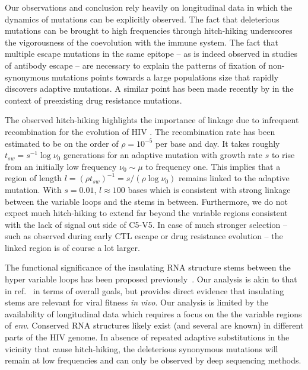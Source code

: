 \documentclass[rmp, twocolumn]{revtex4}
\newcommand{\env}{\textit{env}}
\begin{document}
Our observations and conclusion rely heavily on longitudinal data in which the dynamics of mutations can be explicitly observed. The fact that deleterious mutations can be brought to high frequencies through hitch-hiking underscores the vigorousness of the coevolution with the immune system. The fact that multiple escape mutations in the same epitope -- as is indeed observed in studies of antibody escape \citep{sdfsd} -- are necessary to explain the patterns of fixation of non-synonymous mutations points towards a large populations size that rapidly discovers adaptive mutations. A similar point has been made recently by \citet{boltz_ultrasensitive_2012} in the context of preexisting drug resistance mutations. 

The observed hitch-hiking highlights the importance of linkage due to infrequent recombination for the evolution of HIV \citep{neher_recombination_2010,batorsky_estimate_2011,joseffson_smth_2011}. The recombination rate has been estimated to be on the order of $\rho = 10^{-5}$ per base and day. It takes roughly $t_{sw} = s^{-1} \log \nu_0$ generations for an adaptive mutation with growth rate $s$ to rise from an initially low frequency $\nu_0\sim \mu$ to frequency one. This implies that a region of length $l = (\rho t_{sw})^{-1} = s/(\rho \log \nu_0)$ remains linked to the adaptive mutation. With $s=0.01$, $l\approx 100$ bases which is consistent with strong linkage between the variable loops and the stems in between. Furthermore, we do not expect much hitch-hiking to extend far beyond the variable regions consistent with the lack of signal out side of C5-V5. In case of much stronger selection -- such as observed during early CTL escape or drug resistance evolution -- the linked  region is of course a lot larger. 

The functional significance of the insulating RNA structure stems between the hyper variable loops has been proposed previously~\citep{watts_architecture_2009, sanjuan_interplay_2011}. Our analysis is akin to that in ref.~\citep{sanjuan_interplay_2011} in terms of overall goals, but provides direct evidence that insulating stems are relevant for viral fitness {\it in vivo}. Our analysis is limited by the availability of longitudinal data which requires a focus on the the variable regions of \env. Conserved RNA structures likely exist (and several are known) in different parts of the HIV genome. In absence of repeated adaptive substitutions in the vicinity that cause hitch-hiking, the deleterious synonymous mutations will remain at low frequencies and can only be observed by deep sequencing methods. 
\end{document}

